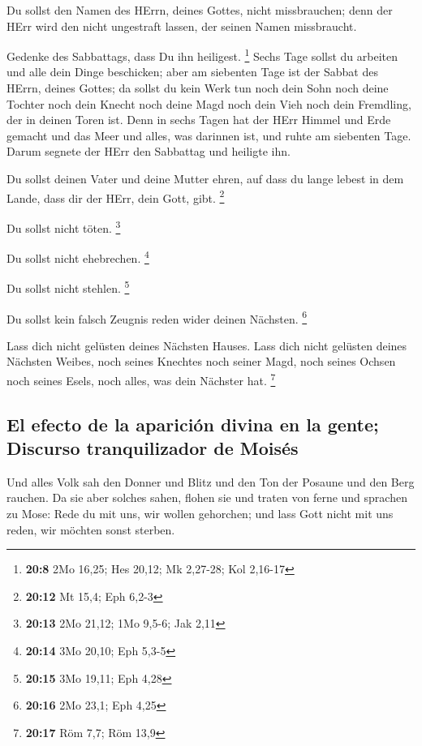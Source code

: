  Du sollst den Namen des HErrn, deines Gottes, nicht
missbrauchen; denn der HErr wird den nicht ungestraft lassen, der seinen
Namen missbraucht.

 Gedenke des Sabbattags, dass Du ihn heiligest.
\footnote{\textbf{20:8} 2Mo 16,25; Hes 20,12; Mk 2,27-28; Kol 2,16-17}
 Sechs Tage sollst du arbeiten und alle dein Dinge
beschicken;  aber am siebenten Tage ist der Sabbat des
HErrn, deines Gottes; da sollst du kein Werk tun noch dein Sohn noch
deine Tochter noch dein Knecht noch deine Magd noch dein Vieh noch dein
Fremdling, der in deinen Toren ist.  Denn in sechs Tagen
hat der HErr Himmel und Erde gemacht und das Meer und alles, was
darinnen ist, und ruhte am siebenten Tage. Darum segnete der HErr den
Sabbattag und heiligte ihn.

 Du sollst deinen Vater und deine Mutter ehren, auf dass
du lange lebest in dem Lande, dass dir der HErr, dein Gott, gibt.
\footnote{\textbf{20:12} Mt 15,4; Eph 6,2-3}

 Du sollst nicht töten. \footnote{\textbf{20:13} 2Mo
  21,12; 1Mo 9,5-6; Jak 2,11}

 Du sollst nicht ehebrechen. \footnote{\textbf{20:14} 3Mo
  20,10; Eph 5,3-5}

 Du sollst nicht stehlen. \footnote{\textbf{20:15} 3Mo
  19,11; Eph 4,28}

 Du sollst kein falsch Zeugnis reden wider deinen
Nächsten. \footnote{\textbf{20:16} 2Mo 23,1; Eph 4,25}

 Lass dich nicht gelüsten deines Nächsten Hauses. Lass
dich nicht gelüsten deines Nächsten Weibes, noch seines Knechtes noch
seiner Magd, noch seines Ochsen noch seines Esels, noch alles, was dein
Nächster hat. \footnote{\textbf{20:17} Röm 7,7; Röm 13,9}

\hypertarget{el-efecto-de-la-apariciuxf3n-divina-en-la-gente-discurso-tranquilizador-de-moisuxe9s}{%
\subsection{El efecto de la aparición divina en la gente; Discurso
tranquilizador de
Moisés}\label{el-efecto-de-la-apariciuxf3n-divina-en-la-gente-discurso-tranquilizador-de-moisuxe9s}}

 Und alles Volk sah den Donner und Blitz und den Ton der
Posaune und den Berg rauchen. Da sie aber solches sahen, flohen sie und
traten von ferne  und sprachen zu Mose: Rede du mit uns,
wir wollen gehorchen; und lass Gott nicht mit uns reden, wir möchten
sonst sterben.

